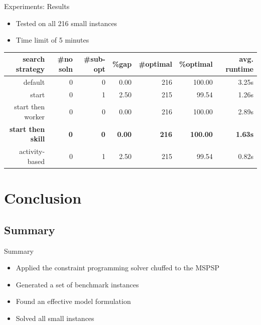 \documentclass{beamer}
\begin{document}
\begin{frame}{Experiments: Results}
	\begin{itemize}
		\item Tested on all 216 small instances
		\item Time limit of 5 minutes \pause
	\end{itemize}
	\begin{table}[H]
		\begin{adjustwidth}{-.9in}{-.9in}
		\centering
		\scriptsize
		\begin{tabular}{r|rrrrrr}
			\hline
			search strategy & \#no soln & \#sub-opt & \%gap & \#optimal & \%optimal & avg. runtime  \\
			\hline
			default & 0 & 0 & 0.00 & 216 & 100.00 & 3.25s \\
			start &  0 & 1 & 2.50 & 215 & 99.54 & 1.26s \\
			start then worker & 0 & 0 & 0.00 & 216 & 100.00 & 2.89s \\
			\bf{start then skill} & \bf{0} & \bf{0} & \bf{0.00} & \bf{216} & \bf{100.00} & \bf{1.63s} \\
			activity-based & 0 & 1 & 2.50 & 215 & 99.54 & 0.82s\\\hline
		\end{tabular}
		\end{adjustwidth}
	\end{table}
\end{frame}

\section{Conclusion}
\subsection{Summary}
\begin{frame}{Summary}
	\begin{itemize}
		\item Applied the constraint programming solver chuffed to the MSPSP\pause
		\vspace{2mm}
		\item Generated a set of benchmark instances\pause
		\vspace{2mm}
		\item Found an effective model formulation\pause
		\vspace{2mm}
		\item Solved all small instances
	\end{itemize}
\end{frame}
\end{document}
